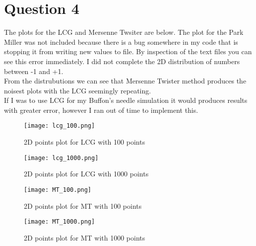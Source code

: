 \documentclass[12pt]{article}
\begin{document}
\section*{Question 4} 
The plots for the LCG and Mersenne Twsiter are below. The plot for the Park Miller was not included 
because there is a bug somewhere in my code that is stopping it from writing new values to file. By inspection of the text files you can see this error immediately. 
I did not complete the 2D distribution of numbers between -1 and +1. 
\\
From the distrubutions we can see that Mersenne Twister method produces the noisest plots with the LCG seemingly repeating. 
\\
If I was to use LCG for my Buffon's needle simulation it would produces results with greater error, however I ran out of time to implement this. 

\begin{figure}[h]
    
    \texttt{[image: lcg\_100.png]}
    \centering
    \caption{2D points plot for LCG with 100 points}
\end{figure}
\begin{figure}[h]
    
    \texttt{[image: lcg\_1000.png]}
    \centering
    \caption{2D points plot for LCG with 1000 points}
\end{figure}
\begin{figure}[h]
    
    \texttt{[image: MT\_100.png]}
    \centering
    \caption{2D points plot for MT with 100 points}
\end{figure}
\begin{figure}[h]
    
    \texttt{[image: MT\_1000.png]}
    \centering
    \caption{2D points plot for MT with 1000 points}
\end{figure}
\end{document}
